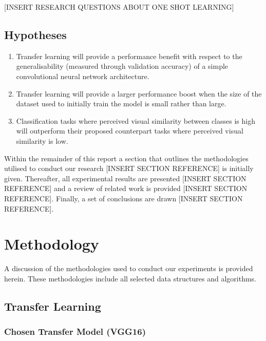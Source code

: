 \documentclass{article}
\begin{document}
[INSERT RESEARCH QUESTIONS ABOUT ONE SHOT LEARNING]

\subsection{Hypotheses}
\label{sec:hypotheses}
\begin{enumerate}[label=\textbf{H.\arabic*}]
  \item \label{h:1} Transfer learning will provide a performance benefit with respect to the generalisability (measured through validation accuracy) of a simple convolutional neural network architecture.
  \item \label{h:2} Transfer learning will provide a larger performance boost when the size of the dataset used to initially train the model is small rather than large.
  \item \label{h:3} Classification tasks where perceived visual similarity between classes is high will outperform their proposed counterpart tasks where perceived visual similarity is low.
 \end{enumerate}

Within the remainder of this report a section that outlines the methodologies utilised to conduct our research [INSERT SECTION REFERENCE] is initially given. Thereafter, all experimental results are presented [INSERT SECTION REFERENCE] and a review of related work is provided [INSERT SECTION REFERENCE]. Finally, a set of conclusions are drawn [INSERT SECTION REFERENCE].

\section{Methodology}
\label{sec:methodology}

A discussion of the methodologies used to conduct our experiments is provided herein. These methodologies include all selected data structures and algorithms.

\subsection{Transfer Learning}
\label{sec:transferlearninng}

\subsubsection{\textbf{Chosen Transfer Model (VGG16)}}
\end{document}
